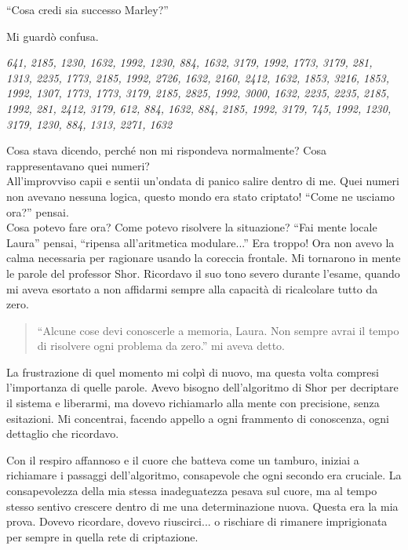 \begin{dialogue}
 \enquote{Cosa credi sia successo Marley?}
\end{dialogue}

Mi guardò confusa.

\begin{dialogue}
 \begin{tcolorbox}[colback=white!95!blue!5, colframe=blue!75!black, title=\textbf{Messaggio di Marley}, fonttitle=\bfseries]
\emph{
641, 2185, 1230, 1632, 1992, 1230, 884, 1632, 3179, 1992, 1773, 3179, 281, 1313, 2235, 1773, 2185, 1992, 2726, 1632, 2160, 2412, 1632, 1853, 3216, 1853, 1992, 1307, 1773, 1773, 3179, 2185, 2825, 1992, 3000, 1632, 2235, 2235, 2185, 1992, 281, 2412, 3179, 612, 884, 1632, 884, 2185, 1992, 3179, 745, 1992, 1230, 3179, 1230, 884, 1313, 2271, 1632
}
\end{tcolorbox}

\end{dialogue}



Cosa stava dicendo, perché non mi rispondeva normalmente? Cosa rappresentavano quei numeri?\\
All'improvviso capii e sentii un'ondata di panico salire dentro di me. Quei numeri non avevano nessuna logica, questo mondo era stato criptato! ``Come ne usciamo ora?'' pensai.\\ 
Cosa potevo fare ora? Come potevo risolvere la situazione? ``Fai mente locale Laura'' pensai, ``ripensa all'aritmetica modulare...'' Era troppo! Ora non avevo la calma necessaria per ragionare usando la coreccia frontale. Mi tornarono in mente le parole del professor Shor. Ricordavo il suo tono severo durante l'esame, quando mi aveva esortato a non affidarmi sempre alla capacità di ricalcolare tutto da zero.

\begin{quote}
\enquote{Alcune cose devi conoscerle a memoria, Laura. Non sempre avrai il tempo di risolvere ogni problema da zero.} mi aveva detto.
\end{quote}

La frustrazione di quel momento mi colpì di nuovo, ma questa volta compresi l'importanza di quelle parole. Avevo bisogno dell'algoritmo di Shor per decriptare il sistema e liberarmi, ma dovevo richiamarlo alla mente con precisione, senza esitazioni. Mi concentrai, facendo appello a ogni frammento di conoscenza, ogni dettaglio che ricordavo.

Con il respiro affannoso e il cuore che batteva come un tamburo, iniziai a richiamare i passaggi dell'algoritmo, consapevole che ogni secondo era cruciale. La consapevolezza della mia stessa inadeguatezza pesava sul cuore, ma al tempo stesso sentivo crescere dentro di me una determinazione nuova. Questa era la mia prova. Dovevo ricordare, dovevo riuscirci... o rischiare di rimanere imprigionata per sempre in quella rete di criptazione.

